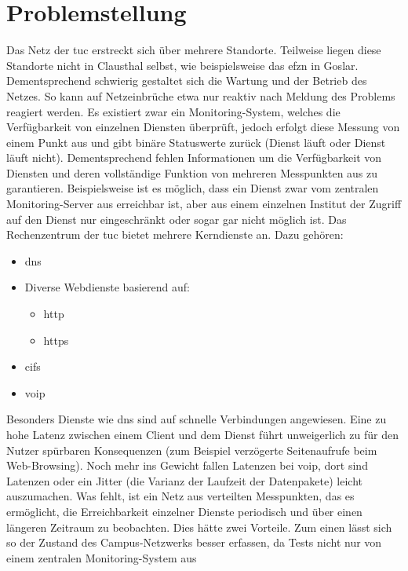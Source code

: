 \documentclass[titlepage]{report}
\begin{document}
\chapter*{Problemstellung}
Das Netz der \gls{tuc} erstreckt sich über mehrere
Standorte. Teilweise liegen diese Standorte nicht in Clausthal
selbst, wie beispielsweise das \gls{efzn} in Goslar. Dementsprechend
schwierig gestaltet sich die Wartung und der Betrieb
des Netzes. So kann auf Netzeinbrüche etwa nur reaktiv
nach Meldung des Problems reagiert werden. Es existiert
zwar ein Monitoring-System, welches die Verfügbarkeit von
einzelnen Diensten überprüft, jedoch erfolgt diese Messung
von einem Punkt aus und gibt binäre Statuswerte
zurück (Dienst läuft oder Dienst läuft nicht). Dementsprechend
fehlen Informationen um die Verfügbarkeit von Diensten und
deren vollständige Funktion von mehreren Messpunkten aus
zu garantieren. Beispielsweise ist es möglich, dass ein Dienst
zwar vom zentralen Monitoring-Server aus erreichbar ist, aber
aus einem einzelnen Institut der Zugriff auf den Dienst nur
eingeschränkt oder sogar gar nicht möglich ist. Das Rechenzentrum der
\gls{tuc} bietet mehrere Kerndienste an. Dazu
gehören:
\begin{itemize}
    \item \gls{dns}
    \item Diverse Webdienste basierend auf:
    \begin{itemize}
        \item \gls{http}
        \item \gls{https}
    \end{itemize}
    \item \gls{cifs}
    \item \gls{voip}
\end{itemize}
Besonders Dienste wie \gls{dns} sind auf schnelle Verbindungen
angewiesen. Eine zu hohe Latenz zwischen einem Client und dem Dienst
führt unweigerlich zu für den Nutzer spürbaren Konsequenzen (zum
Beispiel verzögerte Seitenaufrufe beim Web-Browsing). Noch mehr ins
Gewicht fallen Latenzen bei \gls{voip}, dort sind Latenzen oder ein
Jitter (die Varianz der Laufzeit der Datenpakete\cite{JITTERWIKI})
leicht auszumachen. Was fehlt, ist ein Netz aus verteilten Messpunkten,
das es ermöglicht, die Erreichbarkeit einzelner Dienste periodisch und
über einen längeren Zeitraum zu beobachten. Dies hätte zwei Vorteile.
Zum einen lässt sich so der Zustand des Campus-Netzwerks besser
erfassen, da Tests nicht nur von einem zentralen Monitoring-System aus
\end{document}
